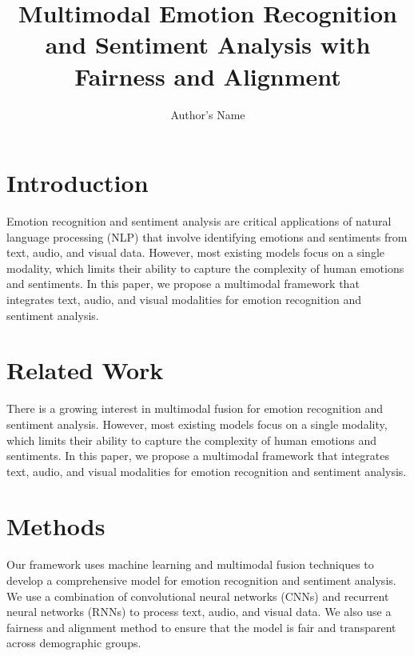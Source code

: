 \documentclass{article}
\title{Multimodal Emotion Recognition and Sentiment Analysis with Fairness and Alignment}
\author{Author's Name}
\begin{document}
\maketitle


\section{Introduction}

Emotion recognition and sentiment analysis are critical applications of natural language processing (NLP) that involve identifying emotions and sentiments from text, audio, and visual data. However, most existing models focus on a single modality, which limits their ability to capture the complexity of human emotions and sentiments. In this paper, we propose a multimodal framework that integrates text, audio, and visual modalities for emotion recognition and sentiment analysis.

\section{Related Work}

There is a growing interest in multimodal fusion for emotion recognition and sentiment analysis. However, most existing models focus on a single modality, which limits their ability to capture the complexity of human emotions and sentiments. In this paper, we propose a multimodal framework that integrates text, audio, and visual modalities for emotion recognition and sentiment analysis.

\section{Methods}

Our framework uses machine learning and multimodal fusion techniques to develop a comprehensive model for emotion recognition and sentiment analysis. We use a combination of convolutional neural networks (CNNs) and recurrent neural networks (RNNs) to process text, audio, and visual data. We also use a fairness and alignment method to ensure that the model is fair and transparent across demographic groups.
\end{document}
